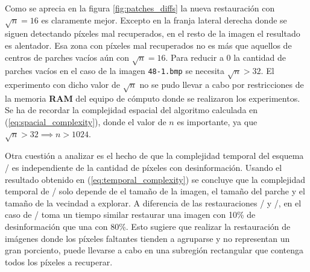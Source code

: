 Como se aprecia en la figura \ref{fig:patches_diffs} la nueva restauraci\'on con $\sqrt{n} = 16$ es claramente mejor. Excepto en la franja lateral derecha donde se siguen detectando p\'ixeles mal recuperados, en el resto de la imagen el resultado es alentador. Esa zona con p\'ixeles mal recuperados no es m\'as que aquellos de centros de parches vac\'ios a\'un con $\sqrt{n} = 16$. Para reducir a 0 la cantidad de parches vac\'ios en el caso de la imagen \texttt{48-1.bmp} se necesita $\sqrt{n} > 32$. El experimento con dicho valor de $\sqrt{n}$ no se pudo llevar a cabo por restricciones de la memoria \textbf{RAM} del equipo de c\'omputo donde se realizaron los experimentos. Se ha de recordar la complejidad espacial del algoritmo calculada en (\ref{eq:spacial_complexity}), donde el valor de $n$ es importante, ya que $\sqrt{n} > 32 \implies n > 1024$.

Otra cuesti\'on a analizar es el hecho de que la complejidad temporal del esquema \SOP/ es independiente de la cantidad de p\'ixeles con desinformaci\'on. Usando el resultado obtenido en (\ref{eq:temporal_complexity}) se concluye que la complejidad temporal de \SOP/ solo depende de el tamaño de la imagen, el tamaño del parche y el tamaño de la vecindad a explorar. A diferencia de las restauraciones \TELEA/ y \NS/, en el caso de \SOP/ toma un tiempo similar restaurar una imagen con 10\% de desinformaci\'on que una con 80\%. Esto sugiere que realizar la restauraci\'on de im\'agenes donde los p\'ixeles faltantes tienden a agruparse y no representan un gran porciento, puede llevarse a cabo en una subregi\'on rectangular que contenga todos los p\'ixeles a recuperar.

